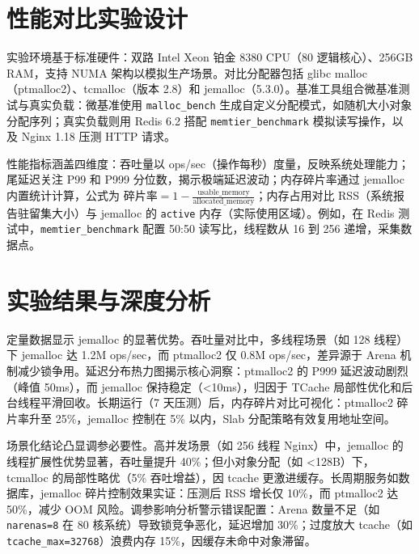 \chapter{性能对比实验设计}
实验环境基于标准硬件：双路 Intel Xeon 铂金 8380 CPU（80 逻辑核心）、256GB RAM，支持 NUMA 架构以模拟生产场景。对比分配器包括 glibc malloc（ptmalloc2）、tcmalloc（版本 2.8）和 jemalloc（5.3.0）。基准工具组合微基准测试与真实负载：微基准使用 \texttt{malloc\_{}bench} 生成自定义分配模式，如随机大小对象分配序列；真实负载则用 Redis 6.2 搭配 \texttt{memtier\_{}benchmark} 模拟读写操作，以及 Nginx 1.18 压测 HTTP 请求。\par
性能指标涵盖四维度：吞吐量以 ops/sec（操作每秒）度量，反映系统处理能力；尾延迟关注 P99 和 P999 分位数，揭示极端延迟波动；内存碎片率通过 jemalloc 内置统计计算，公式为 $\text{碎片率} = 1 - \frac{\text{usable\_memory}}{\text{allocated\_memory}}$；内存占用对比 RSS（系统报告驻留集大小）与 jemalloc 的 \texttt{active} 内存（实际使用区域）。例如，在 Redis 测试中，\texttt{memtier\_{}benchmark} 配置 50:50 读写比，线程数从 16 到 256 递增，采集数据点。\par
\chapter{实验结果与深度分析}
定量数据显示 jemalloc 的显著优势。吞吐量对比中，多线程场景（如 128 线程）下 jemalloc 达 1.2M ops/sec，而 ptmalloc2 仅 0.8M ops/sec，差异源于 Arena 机制减少锁争用。延迟分布热力图揭示核心洞察：ptmalloc2 的 P999 延迟波动剧烈（峰值 50ms），而 jemalloc 保持稳定（<10ms），归因于 TCache 局部性优化和后台线程平滑回收。长期运行（7 天压测）后，内存碎片对比可视化：ptmalloc2 碎片率升至 25\%{}，jemalloc 控制在 5\%{} 以内，Slab 分配策略有效复用地址空间。\par
场景化结论凸显调参必要性。高并发场景（如 256 线程 Nginx）中，jemalloc 的线程扩展性优势显著，吞吐量提升 40\%{}；但小对象分配（如 <128B）下，tcmalloc 的局部性略优（5\%{} 吞吐增益），因 tcache 更激进缓存。长周期服务如数据库，jemalloc 碎片控制效果实证：压测后 RSS 增长仅 10\%{}，而 ptmalloc2 达 50\%{}，减少 OOM 风险。调参影响分析警示错误配置：Arena 数量不足（如 \texttt{narenas=8} 在 80 核系统）导致锁竞争恶化，延迟增加 30\%{}；过度放大 tcache（如 \texttt{tcache\_{}max=32768}）浪费内存 15\%{}，因缓存未命中对象滞留。\par
